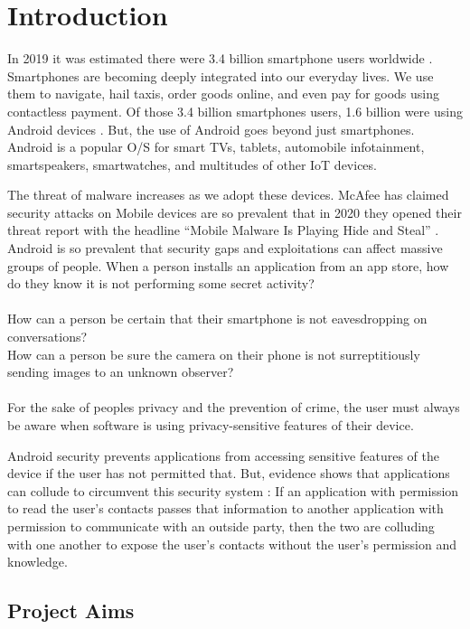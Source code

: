 \chapter{Introduction}

In 2019 it was estimated there were 3.4 billion smartphone users worldwide \cite{SmartphoneUsers2019}.  Smartphones are becoming deeply integrated into our everyday lives.  We use them to navigate, hail taxis, order goods online, and even pay for goods using contactless payment.  Of those 3.4 billion smartphones users, 1.6 billion were using Android devices \cite{AndroidUsers2019}.  But, the use of Android goes beyond just smartphones.  Android is a popular O/S for smart TVs, tablets, automobile infotainment, smartspeakers, smartwatches, and multitudes of other IoT devices.

The threat of malware increases as we adopt these devices.  McAfee has claimed security attacks on Mobile devices are so prevalent that in 2020 they opened their threat report with the headline ``Mobile Malware Is Playing Hide and Steal'' \cite{McAfeeMobileThreatReport}.  Android is so prevalent that security gaps and exploitations can affect massive groups of people.  When a person installs an application from an app store, how do they know it is not performing some secret activity?\\
\\
\noindent How can a person be certain that their smartphone is not eavesdropping on conversations?\\
\noindent How can a person be sure the camera on their phone is not surreptitiously sending images to an unknown observer?\\
\\
For the sake of peoples privacy and the prevention of crime, the user must always be aware when software is using privacy-sensitive features of their device.

Android security prevents applications from accessing sensitive features of the device if the user has not permitted that.  But, evidence shows that applications can collude to circumvent this security system \cite{PrologAppCollusion}:  If an application with permission to read the user's contacts passes that information to another application with permission to communicate with an outside party, then the two are colluding with one another to expose the user's contacts without the user's permission and knowledge.

\section{Project Aims}

